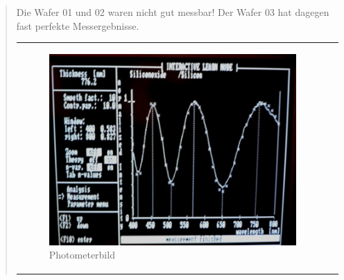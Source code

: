 \begin{quote}
            \vspace{2em}

            Die Wafer 01 und 02 waren nicht gut messbar! Der Wafer 03  hat
            dagegen fast perfekte Messergebnisse.

            \vspace{2em}

    		\begin{center}
                \begin{tabular}{ll}

                \hspace{-7em}
                    \begin{minipage}{0.5\textwidth}
                        \begin{figure}[H]
                        \hspace{-1em}
                            \includegraphics[scale=0.8, trim = 0cm 0cm 0cm
                            0cm, clip]{./HerstellungBilder/Photometerbild.png}
                            \caption{Photometerbild}
                           \label{fig:photobild}
                        \end{figure}

                    \end{minipage}
                    \begin{minipage}{0.7\textwidth}


\end{minipage}
\end{tabular}
\end{center}
\end{quote}
